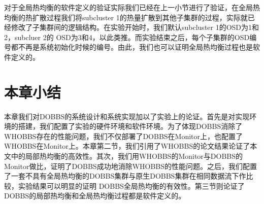 对于全局热均衡的软件定义的验证实际我们已经在上一小节进行了验证，在全局热均衡的热扩散过程我们将subcluster 1的热量扩散到其他子集群的过程，实际就已经修改了子集群间的逻辑结构。在实验开始时，我们默认subcluster 1的OSD为1和2，subcluer 2的
OSD为3和4，以此类推。而实验结束之后，每个子集群的OSD编号都不再是系统初始化时候的编号。由此，我们也可以证明全局热均衡过程也是软件定义的。

\section{本章小结}
本章我们对DOBBS的系统设计和系统实现加以了实验上的论证。首先是对实现环境的搭建，我们配置了实验的硬件环境和软件环境。为了体现DOBBS消除了WHOBBS存在的性能问题，我们不仅部署了DOBBS在Monitor上，也配置了WHOBBS在Monitor上。本章第二节，我们引用了WHOBBS的论文结果论证了本文中的局部热均衡的高效性。其次，我们用WHOBBS的Monitor与DOBBS的Monitor做比，证明了DOBBS成功地消除WHOBBS的性能问题。之后，我们配置了一套不具有全局热均衡的DOBBS集群与原生DOBBS集群在相同数据流下作比较，实验结果可以明显的证明
DOBBS全局热均衡的有效性。第三节则论证了DOBBS的局部热均衡和全局热均衡过程都是软件定义的。
